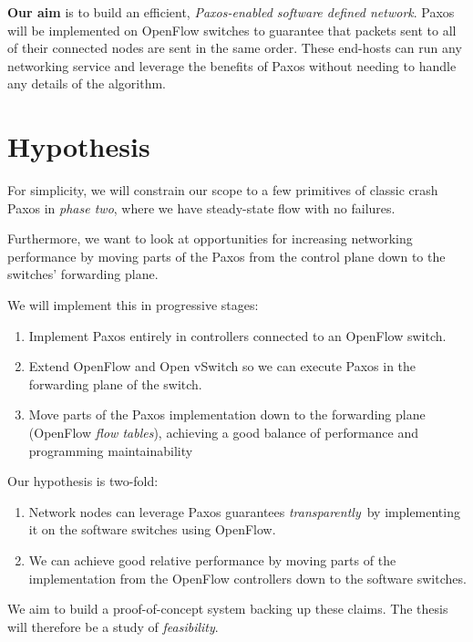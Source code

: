 \textbf{Our aim} is to build an efficient, \textit{Paxos-enabled software defined
network}.  Paxos will be implemented on OpenFlow switches to guarantee that
packets sent to all of their connected nodes are sent in the same order.
These end-hosts can run any networking service and leverage the benefits of
Paxos without needing to handle any details of the algorithm.

\section{Hypothesis}

For simplicity, we will constrain our scope to a few primitives of
classic crash Paxos in \textit{phase two},
where we have steady-state
flow with no failures.

Furthermore, we want to look at opportunities for increasing networking
performance by moving parts of the Paxos from the control
plane down to the switches' forwarding
plane.

We will implement this in progressive stages:

\begin{enumerate}
  \item Implement Paxos entirely in controllers connected to an OpenFlow
  switch.

  \item Extend OpenFlow and Open vSwitch so we can execute Paxos in the
  forwarding plane of the switch.

  \item Move parts of the Paxos implementation down to the forwarding plane
  (OpenFlow \textit{flow tables}), achieving a good balance of performance and
  programming maintainability
\end{enumerate}

Our hypothesis is two-fold:

\begin{enumerate}
\item Network nodes can leverage Paxos guarantees \textit{transparently} by
implementing it on the software switches using OpenFlow.
\item We can achieve good relative performance by moving parts of the
implementation from the OpenFlow controllers down to the software switches.
\end{enumerate}

We aim to build a proof-of-concept system backing up these claims.  The
thesis will therefore be a study of \textit{feasibility}.

